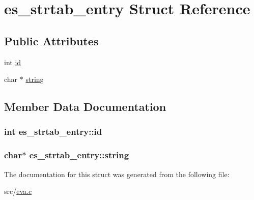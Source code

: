 \hypertarget{structes__strtab__entry}{\section{es\-\_\-strtab\-\_\-entry Struct Reference}
\label{structes__strtab__entry}
}
\subsection*{Public Attributes}
\begin{DoxyCompactItemize}
\item 
int \hyperlink{structes__strtab__entry_a97703a1309c00fd75c5a41ce762c308e}{id}
\item 
char $\ast$ \hyperlink{structes__strtab__entry_a5fa4899526ccc81ca4142701549cb240}{string}
\end{DoxyCompactItemize}


\subsection{Member Data Documentation}
\hypertarget{structes__strtab__entry_a97703a1309c00fd75c5a41ce762c308e}{
\subsubsection[{id}]{\setlength{\rightskip}{0pt plus 5cm}int es\-\_\-strtab\-\_\-entry\-::id}}\label{structes__strtab__entry_a97703a1309c00fd75c5a41ce762c308e}
\hypertarget{structes__strtab__entry_a5fa4899526ccc81ca4142701549cb240}{
\subsubsection[{string}]{\setlength{\rightskip}{0pt plus 5cm}char$\ast$ es\-\_\-strtab\-\_\-entry\-::string}}\label{structes__strtab__entry_a5fa4899526ccc81ca4142701549cb240}


The documentation for this struct was generated from the following file\-:\begin{DoxyCompactItemize}
\item 
src/\hyperlink{eva_8c}{eva.\-c}\end{DoxyCompactItemize}
